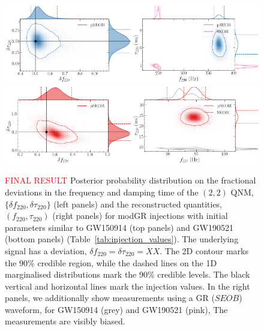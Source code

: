 \documentclass[twocolumn,prd,superscriptaddress,amsfonts,amssymb,amsmath,preprintnumbers]{revtex4-1}
\newcommand{\df}[1]{\delta f_{\text{#1}}}
\newcommand{\dtau}[1]{\delta \tau_{\text{#1}}}
\newcommand{\fngr}[1]{f_{\text{#1}}}
\newcommand{\taungr}[1]{\tau_{\text{#1}}}
\begin{document}
\begin{figure}%
\begin{center}
	\includegraphics[width=0.5\textwidth]{figures/GW150914_simulated_signal_0p5_deltaf220_deltatau220.png}\includegraphics[width=0.5\textwidth]{figures/GW150914_simulated_signal_0p5_gr_ngr_fngrtaungr.png}	
	\includegraphics[width=0.5\textwidth]{figures/GW190521_simulated_signal_0p5_deltaf220_deltatau220.png}\includegraphics[width=0.5\textwidth]{figures/GW190521_simulated_signal_0p5_gr_ngr_fngrtaungr.png}
	\caption{\textcolor{red}{FINAL RESULT} Posterior probability distribution on the fractional deviations in the frequency and damping time of the $(2,2)$ QNM, $\{\df{220},\dtau{220}\}$ (left panels) and the reconstructed quantities, $(\fngr{220}, \taungr{220})$ (right panels) for modGR injections with initial parameters similar to GW150914 (top panels) and GW190521 (bottom panels) (Table~\ref{tab:injection_values}). The underlying signal has a deviation, $\df{220} = \dtau{220} = XX$. The 2D contour marks the 90\% credible region, while the dashed lines on the 1D marginalised distributions mark the 90\% credible levels. The black vertical and horizontal lines mark the injection values. In the right panels, we additionally show measurements using a GR ($SEOB$) waveform, for GW150914 (grey) and GW190521 (pink), The measurements are visibly biased.}
	\label{fig:simulated_signal_nonGR}
\end{center}
\end{figure}
\end{document}

